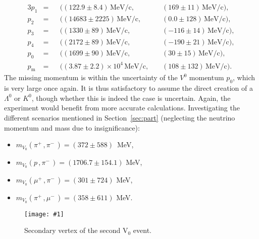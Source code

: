 \documentclass[twocolumn]{article}
\newcommand{\insertFigure}[1]{%
   \texttt{[image: \#1]}%
}
\begin{document}
\begin{alignat*}{3}
	p_1 &= &&((122.9 \pm 8.4)\, \text{MeV/c},\hspace{3pt} && (169 \pm 11)\, \text{MeV/c}),\\
	p_2 &= &&((14683 \pm 2225)\, \text{MeV/c},\hspace{3pt} && (0.0 \pm 128)\, \text{MeV/c}),\\
	p_3 &= &&((1330 \pm 89)\, \text{MeV/c},\hspace{3pt} && (-116 \pm 14)\, \text{MeV/c}),\\
	p_4 &= &&((2172 \pm 89)\, \text{MeV/c},\hspace{3pt} && (-190 \pm 21)\, \text{MeV/c}),\\
	p_{0} &= &&((1699 \pm 90)\, \text{MeV/c},\hspace{3pt} && (30 \pm 15)\, \text{MeV/c}),\\[6pt]
	p_{\text{m}} &= &&((3.87 \pm 2.2)\times 10^4\, \text{MeV/c},\hspace{3pt} && (108 \pm 132)\, \text{MeV/c}).
\end{alignat*}
The missing momentum is within the uncertainty of the $V^0$ momentum $p_0$, which is very large once again. It is thus satisfactory to assume the direct creation of a $\Lambda^0$ or $K^0$, though whether this is indeed the case is uncertain. Again, the experiment would benefit from more accurate calculations. Investigating the different scenarios mentioned in Section~\ref{sec:part} (neglecting the neutrino momentum and mass due to insignificance):
\begin{itemize}
	\item $m_{V_0} ( \pi^+ \, , \pi^-\, ) = (372 \pm 588) \, $ MeV,
	\item $m_{V_0} ( p \, , \pi^- \, ) = (1706.7 \pm 154.1) $ MeV,
	\item $m_{V_0} ( \mu^+ \, , \pi^- \, ) = (301 \pm 724 )$ MeV,
	\item $m_{V_0} ( \pi^+ \, , \mu^- \, ) = (358 \pm 611)$ MeV.
\end{itemize}
\begin{figure}
\centering
\insertFigure{Images/V0second3}
\caption{Secondary vertex of the second V$_0$ event.}
\label{fig:V0second1}
\end{figure}
\end{document}
